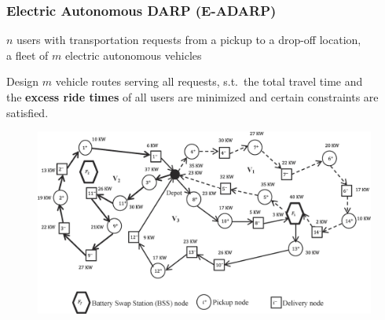 \documentclass[aspectratio=1610]{beamer}
\newcommand{\important}[1]{{\color{green!60!black}#1}}
\let\oldfootnotesize\footnotesize
\renewcommand*{\footnotesize}{\oldfootnotesize\fontsize{6}{4}\selectfont}
\renewcommand{\footnotesize}{\scriptsize}
\begin{document}
\begin{frame}
	\frametitle{Electric Autonomous DARP (E-ADARP) \\ \footnotesize{\textcolor{gray}{\cite{Bongiovanni:2019}}}}
	
\begin{definition}
     $n$ users with transportation requests from a pickup to a drop-off location,\\ a fleet of $m$ \important{electric autonomous} vehicles 

	\medskip
     Design $m$ vehicle routes serving all requests, s.t.\ the \important{total travel time and\\ the \textbf{excess ride times}} of all users are minimized and certain constraints are satisfied.
  \end{definition}
  
\begin{figure}
	\centering
	\includegraphics[scale=0.80]{graphics/darp-bss-example.jpg}
\end{figure}
	
\end{frame}
\end{document}

